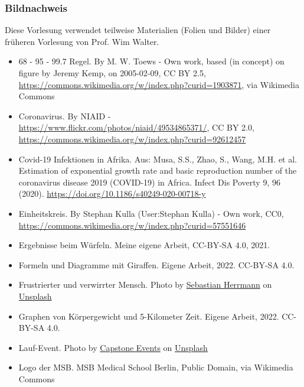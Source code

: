 \documentclass{beamer}
\begin{document}
\begin{frame}
\frametitle{Bildnachweis}

Diese Vorlesung verwendet teilweise Materialien (Folien und Bilder) einer früheren Vorlesung von Prof. Wim Walter.  

\vfill

\begin{tiny}
 
\begin{itemize}


\item
 68 - 95 - 99.7 Regel. By M. W. Toews - Own work, based (in concept) on figure by Jeremy Kemp, on 2005-02-09, CC BY 2.5, \url{https://commons.wikimedia.org/w/index.php?curid=1903871}, via Wikimedia Commons


\item
Coronavirus. By NIAID - \url{https://www.flickr.com/photos/niaid/49534865371/}, CC BY 2.0, \url{https://commons.wikimedia.org/w/index.php?curid=92612457}
\item
Covid-19 Infektionen in Afrika. Aus: Musa, S.S., Zhao, S., Wang, M.H. et al. Estimation of exponential growth rate and basic reproduction number of the coronavirus disease 2019 (COVID-19) in Africa. Infect Dis Poverty 9, 96 (2020). \url{https://doi.org/10.1186/s40249-020-00718-y}



\item
Einheitskreis. By Stephan Kulla (User:Stephan Kulla) - Own work, CC0, \url{https://commons.wikimedia.org/w/index.php?curid=57551646}

\item
Ergebnisse beim Würfeln. Meine eigene Arbeit, CC-BY-SA 4.0, 2021.

\item

Formeln und Diagramme mit Giraffen. Eigene Arbeit, 2022. CC-BY-SA 4.0.

\item
Frustrierter und verwirrter Mensch. Photo by \href{https://unsplash.com/@officestock?utm_source=unsplash&utm_medium=referral&utm_content=creditCopyText}{Sebastian Herrmann} on \href{https://unsplash.com/s/photos/frustration?utm_source=unsplash&utm_medium=referral&utm_content=creditCopyText}{Unsplash}



\item
Graphen von Körpergewicht und 5-Kilometer Zeit. Eigene Arbeit, 2022. CC-BY-SA 4.0.
  \item
Lauf-Event. Photo by \href{https://unsplash.com/@capstoneeventgroup?utm_source=unsplash&utm_medium=referral&utm_content=creditCopyText}{Capstone Events} on \href{https://unsplash.com/s/photos/marathon?utm_source=unsplash&utm_medium=referral&utm_content=creditCopyText}{Unsplash}
\item
Logo der MSB. MSB Medical School Berlin, Public Domain, via Wikimedia Commons


\end{itemize}
\end{tiny}
\end{frame}
\end{document}
